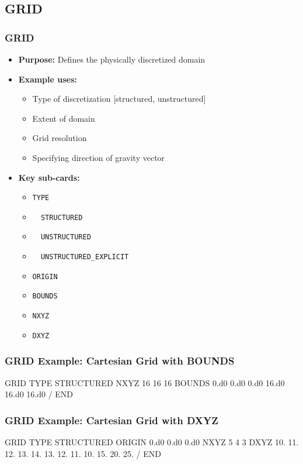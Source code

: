 \subsection{GRID}

\begin{frame}\frametitle{GRID}

\begin{itemize}
\item[] \textbf{Purpose:} Defines the physically discretized domain
\item[] \textbf{Example uses:}
\begin{itemize}
  \item Type of discretization [structured, unstructured]
  \item Extent of domain
  \item Grid resolution
  \item Specifying direction of gravity vector
\end{itemize}
\item[] \textbf{Key sub-cards:}
\begin{itemize}
  \item[] \verb|TYPE|
  \item[] \verb|  STRUCTURED|
  \item[] \verb|  UNSTRUCTURED|
  \item[] \verb|  UNSTRUCTURED_EXPLICIT|
  \item[] \verb|ORIGIN|
  \item[] \verb|BOUNDS|
  \item[] \verb|NXYZ|
  \item[] \verb|DXYZ|
\end{itemize}
\end{itemize}

\end{frame}

\begin{frame}[fragile]\frametitle{GRID Example: Cartesian Grid with BOUNDS}

\begin{semiverbatim}
GRID
  TYPE STRUCTURED
  NXYZ 16 16 16
  BOUNDS
    0.d0 0.d0 0.d0
    16.d0 16.d0 16.d0
  /
END
\end{semiverbatim}

\end{frame}

\begin{frame}[fragile]\frametitle{GRID Example: Cartesian Grid with DXYZ}

\begin{semiverbatim}
GRID
  TYPE STRUCTURED
  ORIGIN {\color{red}0.d0} 0.d0 0.d0
  NXYZ 5 4 3
  DXYZ
    {\color{red}10.} 11. 12. 13. 14.
    13. 12. 11. 10.
    15. 20. 25.
  /
END
\end{semiverbatim}

\end{frame}

